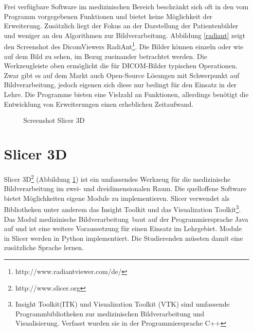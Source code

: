 Frei verfügbare Software im medizinischen Bereich beschränkt sich oft in den vom Programm vorgegebenen Funktionen und bietet keine Möglichkeit der Erweiterung. Zusätzlich liegt der Fokus an der Darstellung der Patientenbilder und weniger an den Algorithmen zur Bildverarbeitung. Abbildung \ref{radiant} zeigt den Screenshot des DicomViewers RadiAnt\footnote{http://www.radiantviewer.com/de/}. Die Bilder können einzeln oder wie auf dem Bild zu sehen, im Bezug zueinander betrachtet werden. Die Werkzeugleiste oben ermöglicht die für DICOM-Bilder typischen Operationen.
Zwar gibt es auf dem Markt auch Open-Source Lösungen mit Schwerpunkt auf Bildverarbeitung, jedoch eigenen sich diese nur bedingt für den Einsatz in der Lehre. Die Programme bieten eine Vielzahl an Funktionen, allerdings benötigt die Entwicklung von Erweiterungen einen erheblichen Zeitaufwand.
 
\begin{figure}[htbp]
  \vspace{0.5cm}
  \centering
  \caption{Screenshot Slicer 3D}
  \label{slicer3d}
  \vspace{0.5cm}
\end{figure}

\section{Slicer 3D}

Slicer 3D\footnote{http://www.slicer.org} (Abbildung \ref{slicer3d}) ist ein umfassendes Werkzeug für die medizinische Bildverarbeitung im zwei- und dreidimensionalen Raum. Die quelloffene Software bietet Möglichkeiten eigene Module zu implementieren. Slicer verwendet als Bibliotheken unter anderem das Insight Toolkit und das Visualization Toolkit\footnote{Insight Toolkit(ITK) und Visualization Toolkit (VTK) sind umfassende Programmbibliotheken zur medizinischen Bildverarbeitung und Visualisierung. Verfasst wurden sie in der Programmiersprache C++}. Das Modul \glqq medizinische Bildverarbeitung\grqq\ baut auf der Programmiersprache Java auf und ist eine weitere Voraussetzung für einen Einsatz im Lehrgebiet. Module in Slicer werden in Python implementiert. Die Studierenden müssten damit eine zusätzliche Sprache lernen.\\

